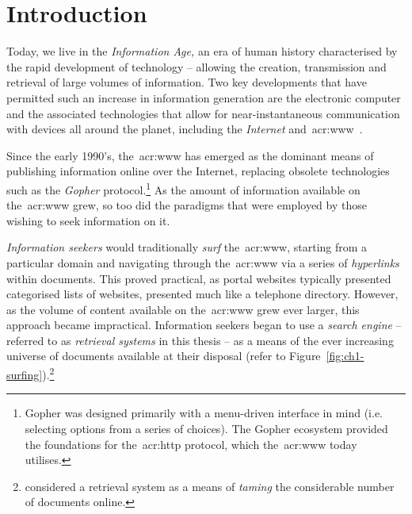 
\chapter{Introduction}\label{chap:intro}
Today, we live in the \emph{Information Age,} an era of human history characterised by the rapid development of technology -- allowing the creation, transmission and retrieval of large volumes of information. Two key developments that have permitted such an increase in information generation are the electronic computer and the associated technologies that allow for near-instantaneous communication with devices all around the planet, including the \emph{Internet} and~\gls{acr:www}~\citep{berners1994www}.

\begin{figure}[h]
    \centering
    \vspace{5mm}
    \label{fig:earth_satellites}
    \vspace{-4mm}
\end{figure}

Since the early 1990's, the~\gls{acr:www} has emerged as the dominant means of publishing information online over the Internet, replacing obsolete technologies such as the \emph{Gopher} protocol.\footnote{Gopher was designed primarily with a menu-driven interface in mind (i.e. selecting options from a series of choices). The Gopher ecosystem provided the foundations for the~\gls{acr:http} protocol, which the~\gls{acr:www} today utilises.} As the amount of information available on the~\gls{acr:www} grew, so too did the paradigms that were employed by those wishing to seek information on it.

\emph{Information seekers} would traditionally \emph{surf} the~\gls{acr:www}, starting from a particular domain and navigating through the~\gls{acr:www} via a series of \emph{hyperlinks} within documents. This proved practical, as portal websites typically presented categorised lists of websites, presented much like a telephone directory. However, as the volume of content available on the~\gls{acr:www} grew ever larger, this approach became impractical. Information seekers began to use a \emph{search engine} -- referred to as \emph{retrieval systems} in this thesis -- as a means of  the ever increasing universe of documents available at their disposal (refer to Figure~\ref{fig:ch1-surfing}).\footnote{\cite{mcbryan1994taming_tools} considered a retrieval system as a means of \emph{taming} the considerable number of documents online.}

